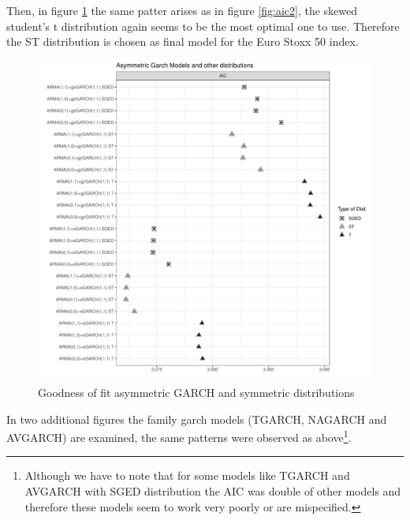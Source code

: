\documentclass[a4paper, nobind]{templates/ociamthesis}
\newcommand*{\bibtitle}{Works Cited}
\begin{document}
\noindent Then, in figure \ref{fig:aic4} the same patter arises as in figure \ref{fig:aic2}, the skewed student's t distribution again seems to be the most optimal one to use. Therefore the ST distribution is chosen as final model for the Euro Stoxx 50 index.

\begin{figure}[h]

{\centering \includegraphics[width=0.9\linewidth]{figures/aicfigures/asymmetric aics2} 

}

\caption{Goodness of fit asymmetric GARCH and symmetric distributions}\label{fig:aic4}
\end{figure}

\noindent In two additional figures the family garch models (TGARCH, NAGARCH and AVGARCH) are examined, the same patterns were observed as above\footnote{Although we have to note that for some models like TGARCH and AVGARCH with SGED distribution the AIC was double of other models and therefore these models seem to work very poorly or are mispecified.}.




\setlength{\baselineskip}{0pt} %

{\renewcommand*\MakeUppercase[1]{#1}%
\printbibliography[heading=bibintoc,title={\bibtitle}]}
\end{document}
